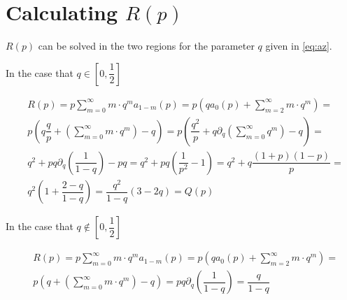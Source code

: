 \documentclass[letterpaper,12pt]{report}
\theoremstyle{plain}
\theoremstyle{definition}
\begin{document}
\section{Calculating $\mathit{R}(p)$ } \label{app:calcrofp}  

$\mathit{R}(p)$  can be solved in the two regions for the parameter $q$ given in \ref{eq:az}.

In the case  that $q\in [0,\dfrac{1}{2}]$

\begin{eqnarray}\label{eq:rpcalc}\nonumber
&\mathit{R}(p)=p\sum_{m=0}^{\infty}m\cdot q^m\mathit{a}_{1-m}(p)=p\left(
q\mathit{a}_0(p)+\sum_{m=2}^{\infty}m\cdot q^m
 \right)=\\\nonumber
 &p\left(
q\dfrac{q}{p}+\left(\sum_{m=0}^{\infty}m\cdot q^m\right)-q
 \right) 
 =p\left(
\dfrac{q^2}{p}+q\partial_q\left(\sum_{m=0}^{\infty} q^m\right)-q
 \right)=\\\nonumber
& q^2+pq\partial_q\left(\dfrac{1}{1-q}\right)-pq 
 = q^2+pq\left(\dfrac{1}{p^2} -1\right) =q^2+q\dfrac{(1+p)(1-p)}{p}=
 \\\nonumber
& q^2\left(1+\dfrac{2-q}{1-q}\right)= \dfrac{q^2}{1-q}\left(
3-2q\right)=\mathit{Q}(p)
\end{eqnarray}


In the case  that $q\notin [0,\dfrac{1}{2}]$

\begin{eqnarray}\nonumber
&\mathit{R}(p)=p\sum_{m=0}^{\infty}m\cdot q^m\mathit{a}_{1-m}(p)=p\left(
q\mathit{a}_0(p)+\sum_{m=2}^{\infty}m\cdot q^m
 \right)=\\\nonumber
 & p\left(q+\left(\sum_{m=0}^{\infty}m\cdot q^m\right)-q \right) =pq\partial_q\left(\dfrac{1}{1-q}\right)=\dfrac{q}{1-q}
\end{eqnarray}


\newpage

\end{document}

